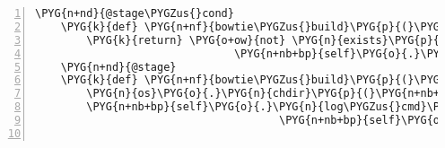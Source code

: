 \begin{Verbatim}[commandchars=\\\{\},numbers=left,firstnumber=1,stepnumber=5]
    \PYG{n+nd}{@stage\PYGZus{}cond}
    \PYG{k}{def} \PYG{n+nf}{bowtie\PYGZus{}build}\PYG{p}{(}\PYG{n+nb+bp}{self}\PYG{p}{)}\PYG{p}{:}
        \PYG{k}{return} \PYG{o+ow}{not} \PYG{n}{exists}\PYG{p}{(}\PYG{n}{join}\PYG{p}{(}\PYG{n+nb+bp}{self}\PYG{o}{.}\PYG{n}{analysis}\PYG{o}{.}\PYG{n}{genbank\PYGZus{}data\PYGZus{}dir}\PYG{p}{,}
                               \PYG{n+nb+bp}{self}\PYG{o}{.}\PYG{n}{analysis}\PYG{o}{.}\PYG{n}{genbankfile\PYGZus{}base\PYGZus{}name} \PYG{o}{+} \PYG{l+s}{"}\PYG{l+s}{.1.bt2}\PYG{l+s}{"}\PYG{p}{)}\PYG{p}{)}
    \PYG{n+nd}{@stage}
    \PYG{k}{def} \PYG{n+nf}{bowtie\PYGZus{}build}\PYG{p}{(}\PYG{n+nb+bp}{self}\PYG{p}{)}\PYG{p}{:}
        \PYG{n}{os}\PYG{o}{.}\PYG{n}{chdir}\PYG{p}{(}\PYG{n+nb+bp}{self}\PYG{o}{.}\PYG{n}{analysis}\PYG{o}{.}\PYG{n}{genbank\PYGZus{}data\PYGZus{}dir}\PYG{p}{)}
        \PYG{n+nb+bp}{self}\PYG{o}{.}\PYG{n}{log\PYGZus{}cmd}\PYG{p}{(}\PYG{l+s}{"}\PYG{l+s}{bowtie2-build}\PYG{l+s}{"}\PYG{p}{,} \PYG{n+nb+bp}{self}\PYG{o}{.}\PYG{n}{analysis}\PYG{o}{.}\PYG{n}{genbankfile\PYGZus{}fa\PYGZus{}name}\PYG{p}{,}
                                      \PYG{n+nb+bp}{self}\PYG{o}{.}\PYG{n}{analysis}\PYG{o}{.}\PYG{n}{genbankfile\PYGZus{}base\PYGZus{}name}\PYG{p}{)}


\end{Verbatim}
